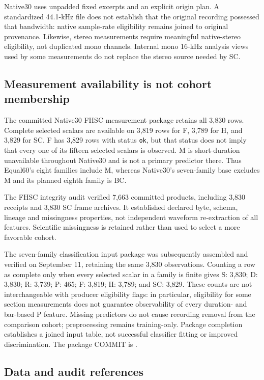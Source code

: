 Native30 uses unpadded fixed excerpts and an explicit origin plan. A standardized
44.1-kHz file does not establish that the original recording possessed that
bandwidth: native sample-rate eligibility remains joined to original provenance.
Likewise, stereo measurements require meaningful native-stereo eligibility,
not duplicated mono channels. Internal mono 16-kHz analysis views used by some
measurements do not replace the stereo source needed by SC.

\subsection{Measurement availability is not cohort membership}

The committed Native30 FHSC measurement package retains all 3,830 rows.
Complete selected scalars are available on 3,819 rows for F, 3,789 for H,
and 3,829 for SC. F has 3,829 rows with status \texttt{ok}, but that status
does not imply that every one of its fifteen selected scalars is observed.
M is short-duration unavailable throughout Native30 and is not a primary
predictor there. Thus Equal60's eight families include M, whereas Native30's
seven-family base excludes M and its planned eighth family is BC.

The FHSC integrity audit verified 7,663 committed products, including 3,830
receipts and 3,830 SC frame archives. It established declared byte, schema,
lineage and missingness properties, not independent waveform re-extraction of
all features. Scientific missingness is retained rather than used to select
a more favorable cohort.

The seven-family classification input package was subsequently assembled and
verified on September 11, retaining the same 3,830 observations. Counting a row
as complete only when every selected scalar in a family is finite gives
S: 3,830; D: 3,830; R: 3,739; P: 465; F: 3,819; H: 3,789; and SC: 3,829.
These counts are not interchangeable with producer eligibility flags: in
particular, eligibility for some section measurements does not guarantee
observability of every duration- and bar-based P feature. Missing predictors
do not cause recording removal from the comparison cohort; preprocessing
remains training-only. Package completion establishes a joined input table,
not successful classifier fitting or improved discrimination.
The package COMMIT is
.

\subsection{Data and audit references}

